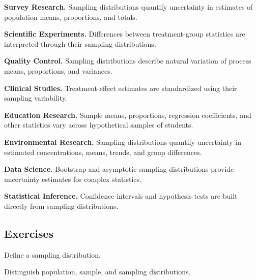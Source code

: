 \begin{applicationbox}

\textbf{Survey Research.}
Sampling distributions quantify uncertainty in estimates of population
means, proportions, and totals.

\medskip

\textbf{Scientific Experiments.}
Differences between treatment-group statistics are interpreted through
their sampling distributions.

\medskip

\textbf{Quality Control.}
Sampling distributions describe natural variation of process means,
proportions, and variances.

\medskip

\textbf{Clinical Studies.}
Treatment-effect estimates are standardized using their sampling
variability.

\medskip

\textbf{Education Research.}
Sample means, proportions, regression coefficients, and other statistics
vary across hypothetical samples of students.

\medskip

\textbf{Environmental Research.}
Sampling distributions quantify uncertainty in estimated concentrations,
means, trends, and group differences.

\medskip

\textbf{Data Science.}
Bootstrap and asymptotic sampling distributions provide uncertainty
estimates for complex statistics.

\medskip

\textbf{Statistical Inference.}
Confidence intervals and hypothesis tests are built directly from
sampling distributions.

\end{applicationbox}

\subsection{Exercises}
\label{subsec:sampling-distribution-exercises}

\begin{exercise}[1]
Define a sampling distribution.
\end{exercise}

\begin{exercise}[1]
Distinguish population, sample, and sampling distributions.
\end{exercise}

